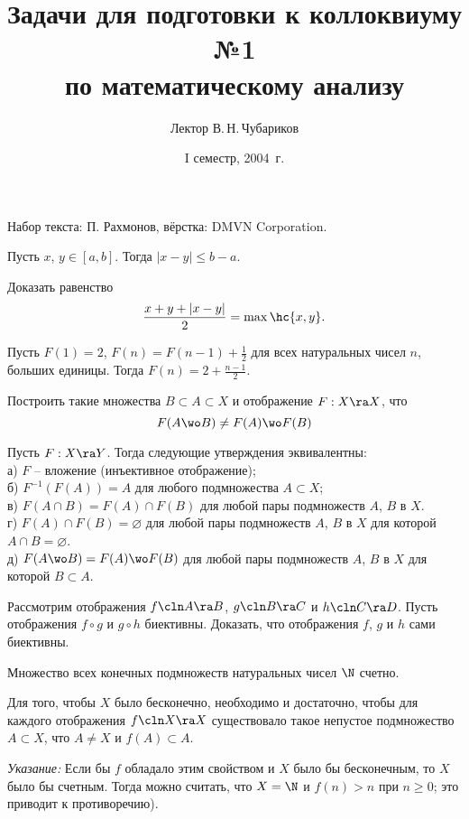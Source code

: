 \documentclass[a4paper]{article}
\title{Задачи для подготовки к коллоквиуму №1\\ по математическому анализу}
\author{Лектор В.\,Н.\,Чубариков}
\date{I семестр, 2004~г.}
\begin{document}
\maketitle
\centerline{\footnotesize Набор текста: П. Рахмонов, вёрстка: DMVN Corporation.}

\begin{nums}{-1}
\item Пусть $x$, $y\in[a, b]$. Тогда $|x-y|\le b-a$.
\item  Доказать равенство
  \begin{equation*}
    \frac{x+y+|x-y|}{2}=\max\hc{x, y}.
  \end{equation*}
\item Пусть $F(1)=2$, $F(n)=F(n-1)+\frac{1}{2}$ для всех
натуральных чисел $n$, больших единицы. Тогда
$F(n)=2+\frac{n-1}{2}$.

\item Построить такие множества $B\subset A\subset X$ и
отображение $F: X\ra X$, что
$$
F(A\wo B)\neq F(A)\wo F(B)
$$

\item Пусть $F: X\ra Y$. Тогда следующие утверждения
эквивалентны:\\
а) $F$ -- вложение (инъективное отображение);\\
б) $F^{-1}(F(A))=A$ для любого подмножества $A\subset X$;\\
в) $F(A\cap B)=F(A)\cap F(B)$ для любой пары подмножеств $A$, $B$ в $X$.\\
г) $F(A)\cap F(B)=\varnothing$ для любой пары подмножеств $A$, $B$ в $X$ для которой $A\cap B=\varnothing$.\\
д) $F(A\wo B)=F(A)\wo F(B)$ для любой пары подмножеств $A$, $B$ в $X$ для которой $B\subset A$.

\item Рассмотрим отображения $f\cln A\ra B$, $g\cln B\ra C$ и $h\cln C\ra D$. Пусть отображения $f\circ g$ и $g\circ h$
биективны. Доказать, что отображения $f$, $g$ и $h$ сами биективны.

\item  Множество всех конечных подмножеств натуральных чисел $\N$ счетно.

\item  Для того, чтобы $X$ было бесконечно, необходимо и
достаточно, чтобы для каждого отображения $f\cln X\ra X$
существовало такое непустое подмножество $A\subset X$, что $A\neq
X$ и $f(A)\subset A$.

\emph{Указание:} Если бы $f$ обладало этим свойством и $X$ было
бы бесконечным, то $X$ было бы счетным. Тогда можно считать, что
$X=\N$ и $f(n)>n$ при $n\ge 0$; это приводит к
противоречию).


\end{nums}
\end{document}
